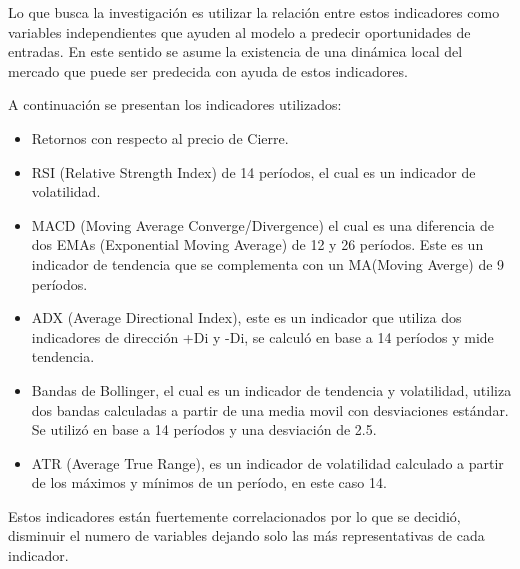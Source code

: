 \documentclass[a4paper,12pt]{Latex/Classes/PhDthesisPSnPDF}
\begin{document}
Lo que busca la investigación es utilizar la relación entre estos indicadores como variables independientes que ayuden al modelo a predecir oportunidades de entradas. En este sentido se asume la existencia de una dinámica local del mercado que puede ser predecida con ayuda de estos indicadores.

A continuación se presentan los indicadores utilizados:

\begin{itemize}
\item Retornos con respecto al precio de Cierre.
\item RSI (Relative Strength Index) de 14 períodos, el cual es un indicador de volatilidad.
\item MACD (Moving Average Converge/Divergence) el cual es una diferencia de dos EMAs (Exponential Moving Average) de 12 y 26 períodos. Este es un indicador de tendencia que se complementa con un MA(Moving Averge) de 9 períodos. 
\item ADX (Average Directional Index), este es un indicador que utiliza dos indicadores de dirección +Di y -Di, se calculó en base a 14 períodos y mide tendencia.
\item Bandas de Bollinger, el cual es un indicador de tendencia y volatilidad, utiliza dos bandas calculadas a partir de una media movil con desviaciones estándar. Se utilizó en base a 14 períodos y una desviación de 2.5.
\item ATR (Average True Range), es un indicador de volatilidad calculado a partir de los máximos y mínimos de un período, en este caso 14.
\end{itemize}

Estos indicadores están fuertemente correlacionados por lo que se decidió, disminuir el numero de variables dejando solo las más representativas de cada indicador.
\end{document}
